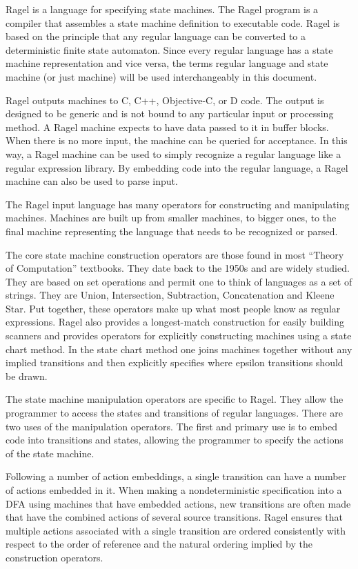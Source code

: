 \documentclass[letterpaper,11pt,oneside]{book}
\begin{document}
Ragel is a language for specifying state machines. The Ragel program is a
compiler that assembles a state machine definition to executable code.  Ragel
is based on the principle that any regular language can be converted to a
deterministic finite state automaton. Since every regular language has a state
machine representation and vice versa, the terms regular language and state
machine (or just machine) will be used interchangeably in this document.

Ragel outputs machines to C, C++, Objective-C, or D code. The output is
designed to be generic and is not bound to any particular input or processing
method. A Ragel machine expects to have data passed to it in buffer blocks.
When there is no more input, the machine can be queried for acceptance.  In
this way, a Ragel machine can be used to simply recognize a regular language
like a regular expression library. By embedding code into the regular language,
a Ragel machine can also be used to parse input.

The Ragel input language has many operators for constructing and manipulating
machines. Machines are built up from smaller machines, to bigger ones, to the
final machine representing the language that needs to be recognized or parsed.

The core state machine construction operators are those found in most ``Theory
of Computation'' textbooks. They date back to the 1950s and are widely studied.
They are based on set operations and permit one to think of languages as a set
of strings. They are Union, Intersection, Subtraction, Concatenation and Kleene
Star. Put together, these operators make up what most people know as regular
expressions. Ragel also provides a longest-match construction for easily
building scanners and provides operators for explicitly constructing machines
using a state chart method. In the state chart method one joins machines
together without any implied transitions and then explicitly specifies where
epsilon transitions should be drawn.

The state machine manipulation operators are specific to Ragel. They allow the
programmer to access the states and transitions of regular languages. There are
two uses of the manipulation operators. The first and primary use is to embed
code into transitions and states, allowing the programmer to specify the
actions of the state machine.

Following a number of action embeddings, a single transition can have a number
of actions embedded in it. When making a nondeterministic specification into a
DFA using machines that have embedded actions, new transitions are often made
that have the combined actions of several source transitions. Ragel ensures
that multiple actions associated with a single transition are ordered
consistently with respect to the order of reference and the natural ordering
implied by the construction operators.
\end{document}
